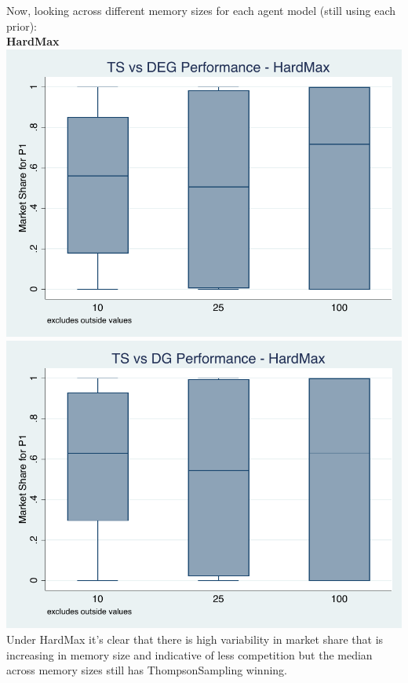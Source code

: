 \documentclass[11pt,letterpaper]{article}
\begin{document}
Now, looking across different memory sizes for each agent model (still using each prior): \\
\textbf{HardMax} \\
\includegraphics[scale=0.9]{hm_ts_deg} \\
\includegraphics[scale=0.9]{hm_ts_dg} \\
Under HardMax it's clear that there is high variability in market share that is increasing in memory size and indicative of less competition but the median across memory sizes still has ThompsonSampling winning.
\end{document}
